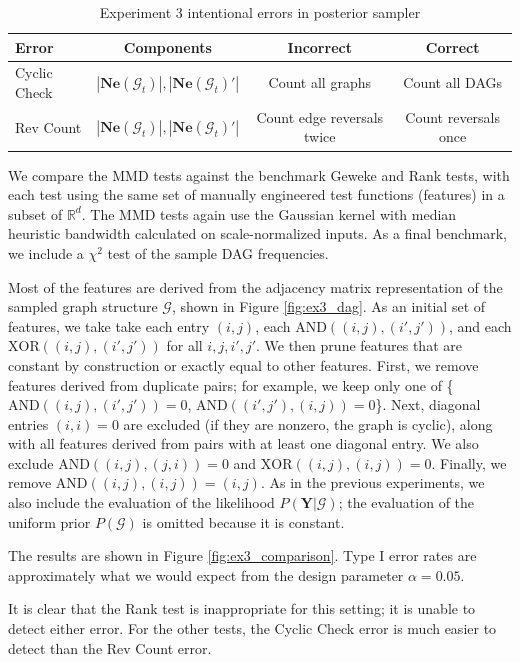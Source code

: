 \documentclass[a4paper,11pt]{article}
\begin{document}
\begin{table}
    \centering
    \begin{tabular}{l|c|c|c}
          Error & Components & Incorrect & Correct \\
         \hline
         Cyclic Check & $|\mathbf{Ne}(\mathcal{G}_t)|, |\mathbf{Ne}(\mathcal{G}_t)'|$ & Count all graphs & Count all DAGs \\
         Rev Count & $|\mathbf{Ne}(\mathcal{G}_t)|, |\mathbf{Ne}(\mathcal{G}_t)'|$ & Count edge reversals twice & Count reversals once \\
    \end{tabular}
    \caption{Experiment 3 intentional errors in posterior sampler}
    \label{tab:ex3_errors}
\end{table}

We compare the MMD tests against the benchmark Geweke and Rank tests, with each test using the same set of manually engineered test functions (features) in a subset of $\mathbb{R}^{d}$. The MMD tests again use the Gaussian kernel with median heuristic bandwidth calculated on scale-normalized inputs. As a final benchmark, we include a $\chi^{2}$ test of the sample DAG frequencies. 

Most of the features are derived from the adjacency matrix representation of the sampled graph structure $\mathcal{G}$, shown in Figure \ref{fig:ex3_dag}. As an initial set of features, we take
take each entry $(i,j)$, each $\mathrm{AND}((i,j),(i',j'))$, and each $\mathrm{XOR}((i,j),(i',j'))$ for all $i,j,i',j'$. We then prune features that are constant by construction or exactly equal to other features. First, we remove features derived from duplicate pairs; for example, we keep only one of \{$\mathrm{AND}((i,j),(i',j'))=0$, $\mathrm{AND}((i',j'),(i,j))=0$\}. Next, diagonal entries $(i,i)=0$ are excluded (if they are nonzero, the graph is cyclic), along with all features derived from pairs with at least one diagonal entry. We also exclude $\mathrm{AND}((i,j),(j,i))=0$ and $\mathrm{XOR}((i,j),(i,j))=0$. Finally, we remove $\mathrm{AND}((i,j),(i,j)) = (i,j)$. As in the previous experiments, we also include the evaluation of the likelihood $P(\mathbf{Y}|\mathcal{G})$; the evaluation of the uniform prior $P(\mathcal{G})$ is omitted because it is constant.

The results are shown in Figure \ref{fig:ex3_comparison}. Type I error rates are approximately what we would expect from the design parameter $\alpha=0.05$.

It is clear that the Rank test is inappropriate for this setting; it is unable to detect either error. For the other tests, the Cyclic Check error is much easier to detect than the Rev Count error. 
\end{document}
